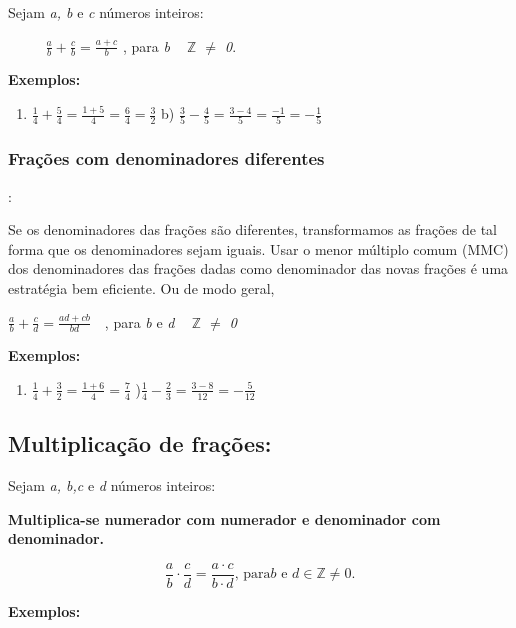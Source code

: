 Sejam \textit{a, b} e \textit{c} números inteiros: 

\textbf{\quad ~~~~  \( \frac{a}{b}+\frac{c}{b}=\frac{a+c}{b} \) \quad }{\fontsize{16pt}{19.2pt}\selectfont \quad , para \textit{b ~  \( \mathbb{Z} \)  $ \neq $  0}.}

\textbf{Exemplos: }

\begin{enumerate}
	\item  \( \frac{1}{4}+\frac{5}{4}=\frac{1+5}{4}=\frac{6}{4}=\frac{3}{2} \) \quad \quad b)  \( \frac{3}{5}-\frac{4}{5}=\frac{3-4}{5}=\frac{-1}{5}=-\frac{1}{5} \) \quad 
\end{enumerate}

\subsubsection{Frações com denominadores diferentes}: 

\begin{justify}
Se os denominadores das frações são diferentes, transformamos as frações de tal forma que os denominadores sejam iguais. Usar o menor múltiplo comum (MMC) dos denominadores das frações dadas como denominador das novas frações é uma estratégia bem eficiente. Ou de modo geral, 
\end{justify}

\begin{justify}
\quad  \( \frac{a}{b}+\frac{c}{d}=\frac{ad+cb}{bd}~~~ \) {\fontsize{16pt}{19.2pt}\selectfont  , para \textit{b }e\textit{ d  ~  \( \mathbb{Z} \)   $ \neq $  0} \qedsymbol{}}
\end{justify}

\textbf{Exemplos:}

\begin{enumerate}
	\item  \( \frac{1}{4}+\frac{3}{2}=\frac{1+6}{4}=\frac{7}{4} \) \quad \quad {}){\fontsize{16pt}{19.2pt}\selectfont   \( \frac{1}{4}-\frac{2}{3}=\frac{3-8}{12}=-\frac{5}{12} \) }
\end{enumerate}

\subsection{Multiplicação de frações:}

Sejam \textit{a, b,c} e \textit{d} números inteiros: 

\begin{caixa}
\textbf{Multiplica-se numerador com numerador e denominador com denominador. }

$$ \frac{a}{b} \cdot \frac{c}{d}=\frac{a \cdot c }{b \cdot d}\textrm{, para} b \textrm{ e } d \in \mathbb{Z} \neq 0 \textrm{.}$$
\end{caixa}
\textbf{Exemplos:}

